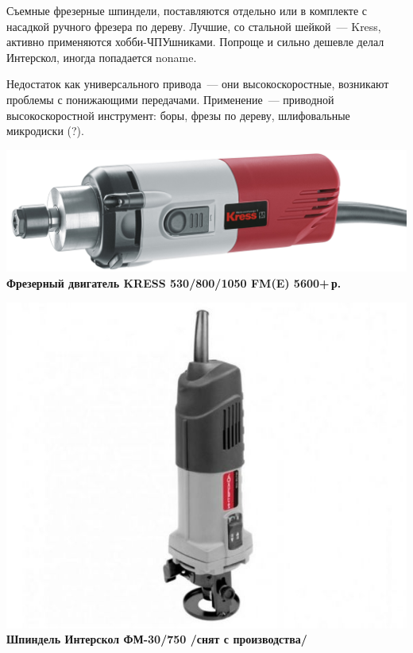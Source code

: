 \documentclass{magazine}
\begin{document}
{\bigskip
Съемные фрезерные шпиндели, поставляются отдельно или в комплекте с
насадкой ручного фрезера по дереву. Лучшие, со стальной шейкой\ --- Kress,
активно применяются хобби-ЧПУшниками. Попроще и сильно дешевле делал Интерскол,
иногда попадается noname.

Недостаток как универсального привода\ --- они высокоскоростные,
возникают проблемы с понижающими передачами. Применение\ --- приводной
высокоскоростной инструмент: боры, фрезы по дереву, шлифовальные микродиски (?).

\noindent\href{http://kress-shop.ru/product/frezernyj-dvigatel-530-fm-kress-06082302/}{
\includegraphics[width=\columnwidth]{fig/00/Kress530.jpg}}
\textbf{Фрезерный двигатель KRESS 530/800/1050 FM(E) 5600+\,р.}

\noindent\includegraphics[width=\columnwidth]{fig/00/Interskol30.jpg}
\textbf{Шпиндель Интерскол ФМ-30/750 /снят с производства/}

}
\end{document}
